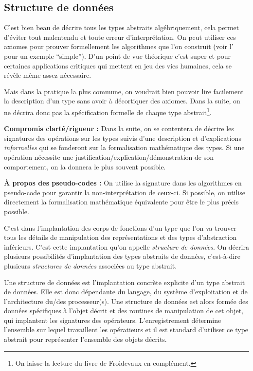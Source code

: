 \documentclass[../../../main.tex]{subfiles}
\begin{document}
\subsection{Structure de données}
C'est bien beau de décrire tous les types abstraits algébriquement, cela permet d'éviter tout malentendu et toute erreur d'interprétation. On peut utiliser ces axiomes pour prouver formellement les algorithmes que l'on construit (voir l' pour un exemple ``simple''). D'un point de vue théorique c'est super et pour certaines applications critiques qui mettent en jeu des vies humaines, cela se révèle même assez nécessaire.

Mais dans la pratique la plus commune, on voudrait bien pouvoir lire facilement la description d'un type sans avoir à décortiquer des axiomes. Dans la suite, on ne décrira donc pas la spécification formelle de chaque type abstrait\footnote{On laisse la lecture du livre de Froidevaux \cite{Froidevaux} en complément.}.

\textbf{Compromis clarté/rigueur :} Dans la suite, on se contentera de décrire les signatures des opérations sur les types suivis d'une description et d'explications \textit{informelles} qui se fonderont sur la formalisation mathématique des types. Si une opération nécessite une justification/explication/démonstration de son comportement, on la donnera le plus souvent possible.

\textbf{À propos des pseudo-codes :} On utilise la signature dans les algorithmes en pseudo-code pour garantir la non-interprétation de ceux-ci. Si possible, on utilise directement la formalisation mathématique équivalente pour être le plus précis possible.

C'est dans l'implantation des corps de fonctions d'un type que l'on va trouver tous les détails de manipulation des représentations et des types d'abstraction inférieurs. C'est cette implantation qu'on appelle \textit{structure de données}. On décrira plusieurs possibilités d'implantation des types abstraits de données, c'est-à-dire plusieurs \textit{structures de données} associées au type abstrait.

 {
	Une structure de données est l'implantation concrète explicite d'un type abstrait de données. Elle est donc dépendante du langage, du système d'exploitation et de l'architecture du/des processeur(s).
}
Une structure de données est alors formée des données spécifiques à l'objet décrit et des routines de manipulation de cet objet, qui implantent les signatures des opérateurs. L'enregistrement détermine l'ensemble sur lequel travaillent les opératieurs et il est standard d'utiliser ce type abstrait pour représenter l'ensemble des objets décrits.
\end{document}
